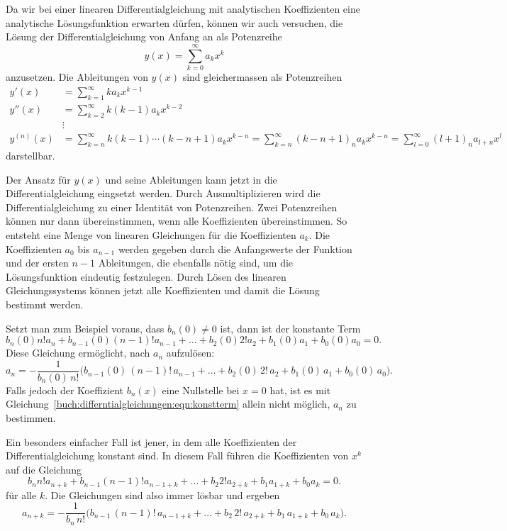 Da wir bei einer linearen Differentialgleichung mit analytischen
Koeffizienten eine analytische Lösungsfunktion erwarten dürfen,
können wir auch versuchen, die Lösung der Differentialgleichung
von Anfang an als Potenzreihe
\[
y(x)
=
\sum_{k=0}^{\infty} a_kx^k
\]
anzusetzen.
Die Ableitungen von $y(x)$ sind gleichermassen als Potenzreihen
\begin{align*}
y'(x)
&=
\sum_{k=1}^\infty ka_kx^{k-1}
\\
y''(x)
&=
\sum_{k=2}^\infty k(k-1)a_kx^{k-2}
\\
&\vdots\\
y^{(n)}(x)
&=
\sum_{k=n}^\infty
k(k-1)\cdots(k-n+1) a_kx^{k-n}
=
\sum_{k=n}^\infty
(k-n+1)_n a_k x^{k-n}
=
\sum_{l=0}^\infty
(l+1)_na_{l+n}x^l
\end{align*}
darstellbar.

Der Ansatz für $y(x)$ und seine Ableitungen kann jetzt in die
Differentialgleichung eingsetzt werden.
Durch Ausmultiplizieren wird die Differentialgleichung zu
einer Identität von Potenzreihen.
Zwei Potenzreihen können nur dann übereinstimmen, wenn alle
Koeffizienten übereinstimmen.
%
So entsteht eine Menge von linearen Gleichungen für die
Koeffizienten $a_k$.
Die Koeffizienten $a_0$ bis $a_{n-1}$ werden gegeben durch die
Anfangswerte der Funktion und der ersten $n-1$ Ableitungen, die
ebenfalls nötig sind, um die Lösungsfunktion eindeutig festzulegen.
Durch Lösen des linearen Gleichungssystems können jetzt alle Koeffizienten
und damit die Lösung bestimmt werden.

Setzt man zum Beispiel voraus, dass $b_n(0)\ne 0$ ist, dann ist der
konstante Term
\begin{equation}
b_n(0) n! a_n + b_{n-1}(0) (n-1)! a_{n-1}
+ \dots +
b_2(0) 2! a_2 + b_1(0) a_1 + b_0(0) a_0 = 0.
\label{buch:differntialgleichungen:eqn:konstterm}
\end{equation}
Diese Gleichung ermöglicht, nach $a_n$ aufzulösen:
\[
a_n
=
-
\frac{1}{b_n(0)\,n!}\bigl(
b_{n-1}(0)\,(n-1)!\,a_{n-1} + \dots + 
b_2(0)\,2!\,a_2 + b_1(0)\, a_1 + b_0(0)\, a_0
\bigr).
\]
Falls jedoch der Koeffizient $b_n(x)$ eine Nullstelle bei $x=0$
hat, ist es mit Gleichung~\eqref{buch:differntialgleichungen:eqn:konstterm}
allein nicht möglich, $a_n$ zu bestimmen.

Ein besonders einfacher Fall ist jener, in dem alle Koeffizienten der
Differentialgleichung konstant sind. 
In diesem Fall führen die Koeffizienten von $x^k$ auf die Gleichung
\begin{equation}
b_n n! a_{n+k} + b_{n-1} (n-1)! a_{n-1+k}
+ \dots +
b_2 2! a_{2+k} + b_1 a_{1+k} + b_0 a_{k} = 0.
\label{buch:differntialgleichungen:eqn:kterm}
\end{equation}
für alle $k$.
Die Gleichungen sind also immer lösbar und ergeben
\[
a_{n+k}
=
-
\frac{1}{b_n\,n!}\bigl(
b_{n-1}\,(n-1)!\,a_{n-1+k} + \dots + 
b_2\,2!\,a_{2+k} + b_1\, a_{1+k} + b_0\, a_k
\bigr).
\]



